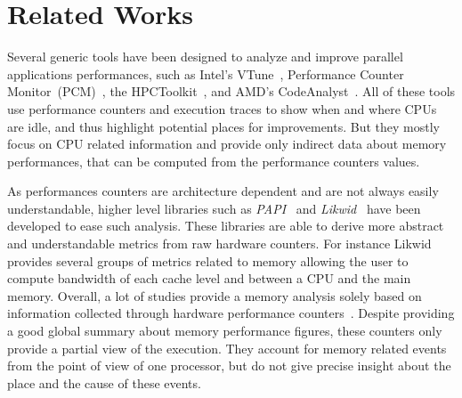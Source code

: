 
\section{Related Works}
\label{sec:related}

Several generic tools have been designed to analyze and improve parallel
applications performances, such as Intel's VTune~\cite{Reinders05VTune},
Performance Counter Monitor~(PCM)~\cite{Intel2012b}, the
HPCToolkit~\cite{Adhianto10HPCTOOLKIT}, and AMD's
CodeAnalyst~\cite{Drongowski2008}. All of these tools use performance
counters and execution traces to show when and where CPUs are idle, and thus
highlight potential places for improvements.
But they mostly focus on CPU related information and provide only
indirect data about memory performances, that can be computed from the performance counters values.

As performances counters are architecture dependent and are not always easily
understandable, higher level libraries such as \emph{PAPI}~\cite{Weaver13PAPI} and
\emph{Likwid}~\cite{Treibig10LIKWID} have been developed to ease such analysis. These
libraries are able to derive more abstract and understandable metrics from raw hardware counters.
For instance Likwid provides several groups of metrics related to memory
allowing the user to compute bandwidth of each cache level and between a CPU
and the main memory.
Overall, a lot of studies provide a memory analysis solely based
on information collected through hardware performance counters~\cite{Majo13(Mis)understanding,
Jiang14Understanding,Bosch00Rivet,Weyers14Visualization,Tao01Visualizing,DeRose01Hardware}.
Despite providing a good global summary about memory performance figures, these counters only provide a partial view of the execution. They
account for memory related events from the point of view of one processor, but
do not give precise insight about the place and the cause of these events.

